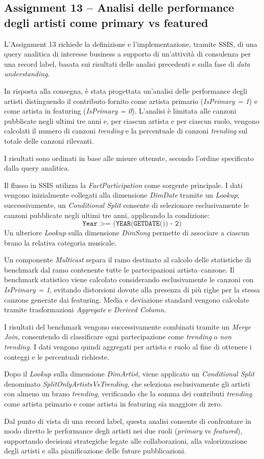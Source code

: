 \subsection*{Assignment 13 -- Analisi delle performance degli artisti come primary vs featured}
L’Assignment 13 richiede la definizione e l’implementazione, tramite SSIS, di una query analitica di interesse business a supporto di un’attività di consulenza per una record label, basata sui risultati delle analisi precedenti e sulla fase di \textit{data understanding}.

In risposta alla consegna, è stata progettata un’analisi delle performance degli artisti distinguendo il contributo fornito come artista primario (\textit{IsPrimary = 1}) e come artista in featuring (\textit{IsPrimary = 0}). L’analisi è limitata alle canzoni pubblicate negli ultimi tre anni e, per ciascun artista e per ciascun ruolo, vengono calcolati il numero di canzoni \textit{trending} e la percentuale di canzoni \textit{trending} sul totale delle canzoni rilevanti.

I risultati sono ordinati in base alle misure ottenute, secondo l’ordine specificato dalla query analitica.

Il flusso in SSIS utilizza la \textit{FactParticipation} come sorgente principale. I dati vengono inizialmente collegati alla dimensione \textit{DimDate} tramite un \textit{Lookup}; successivamente, un \textit{Conditional Split} consente di selezionare esclusivamente le canzoni pubblicate negli ultimi tre anni, applicando la condizione:
\[
\texttt{Year >= (YEAR(GETDATE()) - 2)}
\]
Un ulteriore \textit{Lookup} sulla dimensione \textit{DimSong} permette di associare a ciascun brano la relativa categoria musicale.

Un componente \textit{Multicast} separa il ramo destinato al calcolo delle statistiche di benchmark dal ramo contenente tutte le partecipazioni artista--canzone. Il benchmark statistico viene calcolato considerando esclusivamente le canzoni con \textit{IsPrimary = 1}, evitando distorsioni dovute alla presenza di più righe per la stessa canzone generate dai featuring. Media e deviazione standard vengono calcolate tramite trasformazioni \textit{Aggregate} e \textit{Derived Column}.

I risultati del benchmark vengono successivamente combinati tramite un \textit{Merge Join}, consentendo di classificare ogni partecipazione come \textit{trending} o \textit{non trending}. I dati vengono quindi aggregati per artista e ruolo al fine di ottenere i conteggi e le percentuali richieste.

Dopo il \textit{Lookup} sulla dimensione \textit{DimArtist}, viene applicato un \textit{Conditional Split} denominato \textit{SplitOnlyArtistsVsTrending}, che seleziona esclusivamente gli artisti con almeno un brano \textit{trending}, verificando che la somma dei contributi \textit{trending} come artista primario e come artista in featuring sia maggiore di zero.

Dal punto di vista di una record label, questa analisi consente di confrontare in modo diretto le performance degli artisti nei due ruoli (\textit{primary} vs \textit{featured}), supportando decisioni strategiche legate alle collaborazioni, alla valorizzazione degli artisti e alla pianificazione delle future pubblicazioni.
